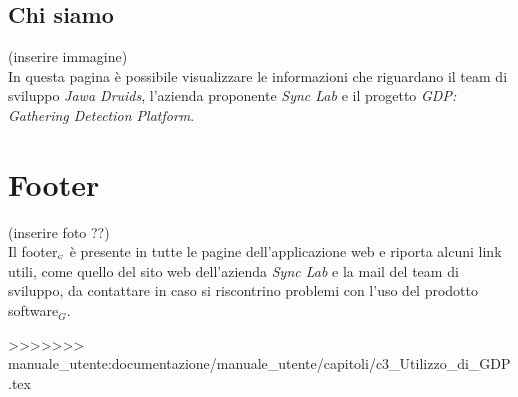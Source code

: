 \subsection{Chi siamo} \label{UtilizzoDiGDPGatheringDetecionPlatformContenutoCentraleChiSiamo}
(inserire immagine)\\
In questa pagina è possibile visualizzare le informazioni che riguardano il team di sviluppo \textit{Jawa Druids}, l'azienda proponente \textit{Sync Lab} e il progetto \textit{GDP: Gathering Detection Platform}. 

\section{Footer}\label{UtilizzoDiGDPGatheringDetecionPlatformFooter}
(inserire foto ??) \\
Il footer$_{\scaleto{G}{3pt}}$ è presente in tutte le pagine dell'applicazione web e riporta alcuni link utili, come quello del sito web dell'azienda \textit{Sync Lab} e la mail del team di sviluppo, da contattare in caso si riscontrino problemi con l'uso del prodotto software$_G$. 


>>>>>>> manuale_utente:documentazione/manuale_utente/capitoli/c3_Utilizzo_di_GDP.tex
